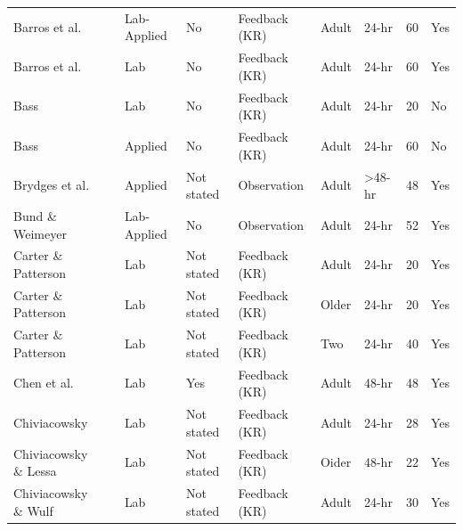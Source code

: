 \documentclass[man,floatsintext,hidelinks]{apa7}
\begin{document}
\begin{landscape}
\begin{longtable}[l]{lllllllll}
Barros et al.         & \citeyear[Exp 1]{Barros2019-my}    & Lab-Applied & No           & Feedback (KR)         & Adult        & 24-hr              & 60  & Yes       \\
Barros et al.         & \citeyear[Exp 2]{Barros2019-my}   & Lab         & No           & Feedback (KR)         & Adult        & 24-hr              & 60  & Yes       \\
Bass                  & \citeyear{Bass2015-cc}           & Lab         & No           & Feedback (KR)         & Adult        & 24-hr              & 20  & No        \\
Bass                  & \citeyear{Bass2018-vz}          & Applied     & No           & Feedback (KR)         & Adult        & 24-hr              & 60  & No        \\
Brydges et al.        & \citeyear{Brydges2009-zb}          & Applied     & Not stated   & Observation           & Adult        & \textgreater 48-hr & 48  & Yes       \\
Bund \& Weimeyer      & \citeyear{Bund2004-hy}          & Lab-Applied & No           & Observation           & Adult        & 24-hr              & 52  & Yes       \\
Carter \& Patterson   & \citeyear{Carter2012-sj}          & Lab         & Not stated   & Feedback (KR)         & Adult        & 24-hr              & 20  & Yes       \\
Carter \& Patterson   & \citeyear{Carter2012-sj}          & Lab         & Not stated   & Feedback (KR)         & Older        & 24-hr              & 20  & Yes       \\
Carter \& Patterson   & \citeyear{Carter2012-sj}          & Lab         & Not stated   & Feedback (KR)         & Two          & 24-hr              & 40  & Yes       \\
Chen et al.           & \citeyear{Chen2002-vg}          & Lab         & Yes          & Feedback (KR)         & Adult        & 48-hr              & 48  & Yes       \\
Chiviacowsky          & \citeyear{Chiviacowsky2014-ob}          & Lab         & Not stated   & Feedback (KR)         & Adult        & 24-hr              & 28  & Yes       \\
Chiviacowsky \& Lessa & \citeyear{Chiviacowsky2017-fy}          & Lab         & Not stated   & Feedback (KR)         & Oider        & 48-hr              & 22  & Yes       \\
Chiviacowsky \& Wulf  & \citeyear{Chiviacowsky2002-ep}          & Lab         & Not stated   & Feedback (KR)         & Adult        & 24-hr              & 30  & Yes       \\

\end{longtable}
\end{landscape}
\end{document}
